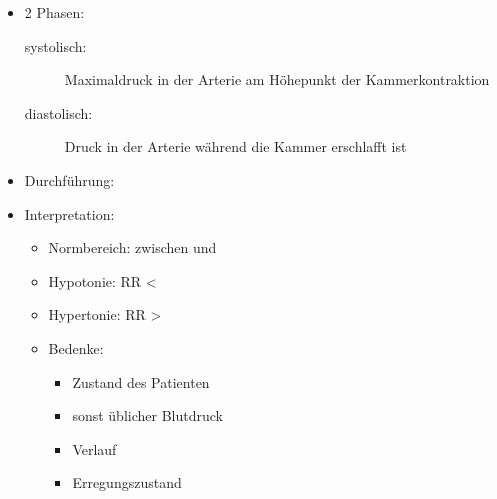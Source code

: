 {}{%
\begin{itemize}
  \item 2 Phasen:
  \begin{description}
    \item[systolisch:] Maximaldruck in der Arterie am
    Höhepunkt der
    Kammerkontraktion
    \item[diastolisch:] Druck in der Arterie während die
    Kammer erschlafft ist
  \end{description}
  \item Durchführung:
  \item Interpretation:
  \begin{itemize}
    \item {Normbereich}: zwischen  und
    \item {Hypotonie}: RR {\textless}~
    \item {Hypertonie}: RR {\textgreater}~
    \item Bedenke:
    \begin{itemize}
      \item {Zustand} des Patienten
      \item sonst üblicher Blutdruck
      \item {Verlauf}
      \item {Erregungszustand}
    \end{itemize}
  \end{itemize}
\end{itemize}
}{}{}{}







